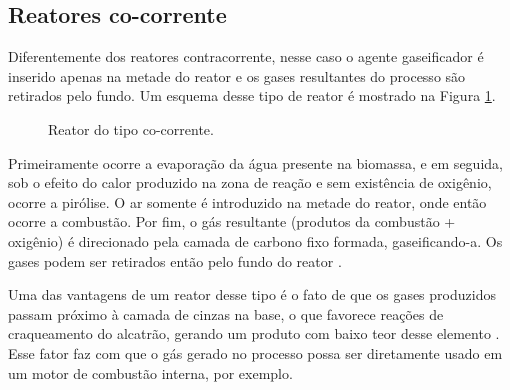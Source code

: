 \subsection{Reatores co-corrente}
Diferentemente dos reatores contracorrente, nesse caso o agente gaseificador é inserido apenas na metade do reator e os gases resultantes do processo são retirados pelo fundo. Um esquema desse tipo de reator é mostrado na Figura \ref{fig:downdraft}.

\begin{figure}[!ht]
	\centering
	\caption{Reator do tipo co-corrente.}
	\label{fig:downdraft}
\end{figure}

Primeiramente ocorre a evaporação da água presente na biomassa, e em seguida, sob o efeito do calor produzido na zona de reação e sem existência de oxigênio, ocorre a pirólise. O ar somente é introduzido na metade do reator, onde então ocorre a combustão. Por fim, o gás resultante (produtos da combustão + oxigênio) é direcionado pela camada de carbono fixo formada, gaseificando-a. Os gases podem ser retirados então pelo fundo do reator \cite{Basu}.

Uma das vantagens de um reator desse tipo é o fato de que os gases produzidos passam próximo à camada de cinzas na base, o que favorece reações de craqueamento do alcatrão, gerando um produto com baixo teor desse elemento \cite{Basu}. Esse fator faz com que o gás gerado no processo possa ser diretamente usado em um motor de combustão interna, por exemplo.



